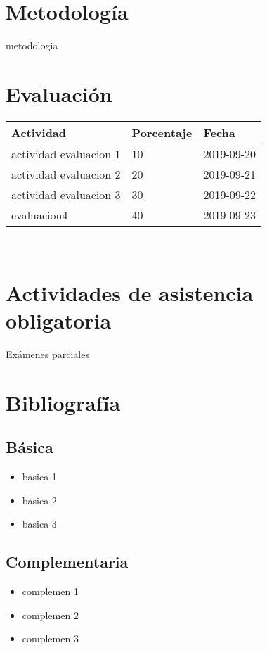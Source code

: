 \documentclass[11pt]{article}
\begin{document}
\section*{Metodología}

metodologia

\section*{Evaluación}
\noindent \begin{tabular}{R{0.5\textwidth} C{0.2\textwidth} C{0.2\textwidth}}
	\toprule
	\textbf{Actividad} & \textbf{Porcentaje} & \textbf{Fecha} \\
	\midrule
	actividad evaluacion 1 & 10 & 2019-09-20 \\ actividad evaluacion 2 & 20 & 2019-09-21 \\ actividad evaluacion 3 & 30 & 2019-09-22 \\ evaluacion4 & 40 & 2019-09-23 \\ 
	\midrule
\end{tabular}
\\
\section*{Actividades de asistencia obligatoria}

Exámenes parciales

\section*{Bibliografía}

\subsection*{Básica}

\begin{itemize}
\item basica 1 \item basica 2 \item basica 3 
\end{itemize}

\subsection*{Complementaria}

\begin{itemize}
\item complemen 1 \item complemen 2 \item complemen 3 
\end{itemize}
\end{document}
